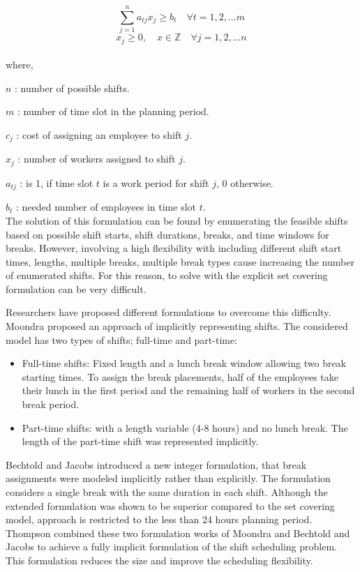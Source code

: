 \begin{equation}
\sum_{j=1}^n a_{tj} x_j \ge b_t \quad \forall t = 1, 2, ...m
\end{equation}
\begin{equation}
x_{j} \ge 0, \quad x \in \mathbb{Z} \quad \forall j = 1, 2, ...n 
\end{equation}
\\ where,

$n$ : number of possible shifts.

$m$ : number of time slot in the planning period.

$c_{j}$ : cost of assigning an employee to shift $j$.

$x_{j}$ : number of workers assigned to shift $j$.

$a_{tj}$ : is 1, if time slot $t$ is a work period for shift $j$, 0 otherwise.

$b_t$ : needed number of employees in time slot $t$. \\

The solution of this formulation can be found by enumerating the feasible shifts based on possible shift starts, shift durations, breaks, and time windows for breaks. However, involving a high flexibility with including different shift start times, lengths, multiple breaks, multiple break types cause increasing the number of enumerated shifts. For this reason, to solve with the explicit set covering formulation can be very difficult.

Researchers have proposed different formulations to overcome this difficulty. Moondra \cite{li:1976:moondra} proposed an approach of implicitly representing shifts. The considered model has two types of shifts; full-time and part-time:

\begin{itemize}
\item Full-time shifts: Fixed length and a lunch break window allowing two break starting times. To assign the break placements, half of the employees take their lunch in the first period and the remaining half of workers in the second break period.
\item Part-time shifts: with a length variable (4-8 hours) and no lunch break. The  length of the part-time shift was represented implicitly. 
\end{itemize}

Bechtold and Jacobs \cite{li:1990:bechtold} introduced a new integer formulation, that break assignments were modeled implicitly rather than explicitly. The formulation considers a single break with the same duration in each shift. Although the extended formulation was shown to be superior compared to the set covering model, approach is restricted to the less than 24 hours planning period. Thompson \cite{li:1995:thompson} combined these two formulation works of Moondra \cite{li:1976:moondra} and Bechtold and Jacobs \cite{li:1990:bechtold} to achieve a fully implicit formulation of the shift scheduling problem. This formulation reduces the size and improve the scheduling flexibility.


